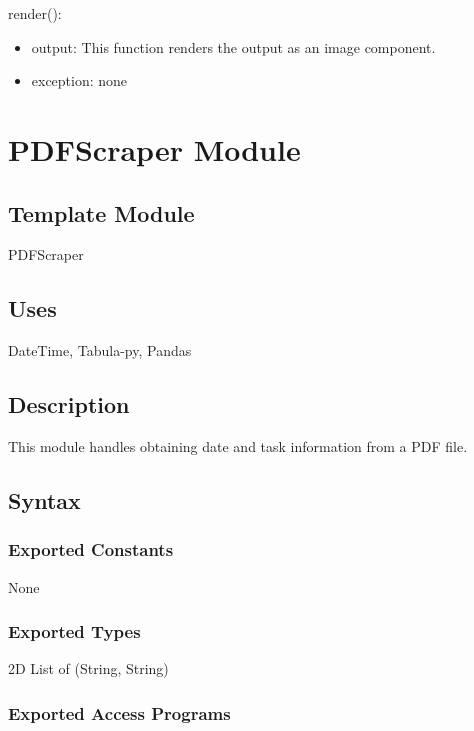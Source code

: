 \documentclass[12pt, titlepage]{article}
\begin{document}
\noindent render():
\begin{itemize}
\item output: This function renders the output as an image component.
\item exception: none
\end{itemize}



\newpage

\section{PDFScraper Module}

\subsection{Template Module}

PDFScraper

\subsection{Uses}

DateTime, Tabula-py, Pandas

\subsection{Description}
This module handles obtaining date and task information from a PDF file.

\subsection{Syntax}

\subsubsection{Exported Constants}

None

\subsubsection{Exported Types}

2D List of (String, String)

\subsubsection{Exported Access Programs}
\end{document}
